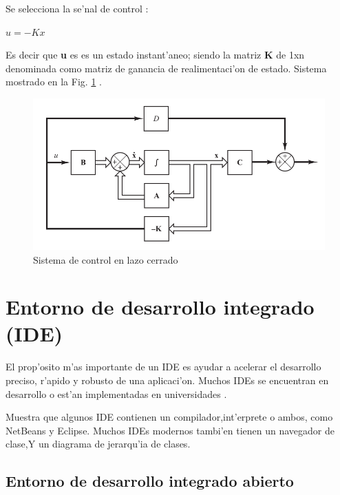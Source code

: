 Se selecciona la se'nal de control :
\begin{center} 
$u=-Kx$
\end{center}

Es decir que \textbf{u} es es un estado instant'aneo; siendo la matriz \textbf{K} de 1xn denominada como matriz de ganancia de realimentaci'on de estado. Sistema mostrado en la Fig. \ref{fig:siscerrado} \citep{ogata}.
\begin{figure}[ht]
	\centering
		\includegraphics[scale=0.6]{sccerrado}
	\caption{Sistema de control en lazo cerrado}
	\label{fig:siscerrado}
\end{figure}

\setlength{\parskip}{0.4cm}

\section{Entorno de desarrollo integrado (IDE)}

El prop'osito m'as importante de un IDE es ayudar a acelerar el desarrollo preciso, r'apido y robusto de una aplicaci'on. Muchos IDEs se encuentran en desarrollo o est'an implementadas en universidades \citep{Ainternational}.


\citet{kavitha} Muestra que algunos IDE contienen un compilador,int'erprete o ambos, como NetBeans y Eclipse. Muchos
IDEs modernos tambi'en tienen un navegador de clase,Y un diagrama de jerarqu'ia de clases.

\subsection{Entorno de desarrollo integrado abierto }

